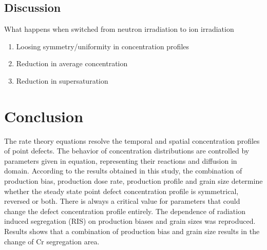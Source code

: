 \documentclass[a4paper]{article}
\begin{document}
  \subsection{Discussion} \hspace{10pt}

  What happens when switched from neutron irradiation to ion irradiation
  \begin{enumerate}
    \item Loosing symmetry/uniformity in concentration profiles
    \item Reduction in average concentration
    \item Reduction in supersaturation
  \end{enumerate}

\section{Conclusion} \hspace{10pt}

The rate theory equations resolve the temporal and spatial concentration profiles of point defects. The behavior of concentration distributions are controlled by parameters given in equation, representing their reactions and diffusion in domain. According to the results obtained in this study, the combination of production bias, production dose rate, production profile and grain size determine whether the steady state point defect concentration profile is symmetrical, reversed or both. There is always a critical value for parameters that could change the defect concentration profile entirely.
The dependence of radiation induced segregation (RIS) on production biases and grain sizes was reproduced. Results shows that a combination of production bias and grain size results in the change of Cr segregation area.



\end{document}
